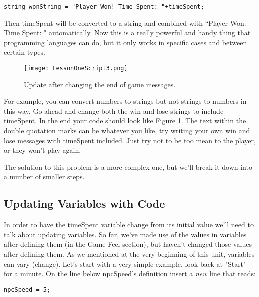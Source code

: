 \documentclass{article}
\begin{document}
\lstset{style=sharpc}
\begin{lstlisting}
string wonString = "Player Won! Time Spent: "+timeSpent;
\end{lstlisting}

Then timeSpent will be converted to a string and combined with ``Player Won. Time Spent: " automatically. Now this is a really powerful and handy thing that programming languages can do, but it only works in specific cases and between certain types. 

\begin{figure}
  \texttt{[image: LessonOneScript3.png]}
  \caption{Update after changing the end of game messages.}
  \label{fig:code3}
\end{figure}

For example, you can convert numbers to strings but not strings to numbers in this way. Go ahead and change both the win and lose strings to include timeSpent. In the end your code should look like Figure \ref{fig:code3}. The text within the double quotation marks can be whatever you like, try writing your own win and lose messages with timeSpent included. Just try not to be too mean to the player, or they won't play again. 

\noindent{}\newline The solution to this problem is a more complex one, but we'll break it down into a number of smaller steps. 

\subsection{Updating Variables with Code}

In order to have the timeSpent variable change from its initial value we'll need to talk about updating variables. So far, we've made use of the values in variables after defining them (in the Game Feel section), but haven't changed those values after defining them. As we mentioned at the very beginning of this unit, variables can vary (change). Let's start with a very simple example, look back at "Start" for a minute. On the line below npcSpeed's definition insert a \textit{new} line that reads:

\lstset{style=sharpc}
\begin{lstlisting}
npcSpeed = 5;
\end{lstlisting}
\end{document}
